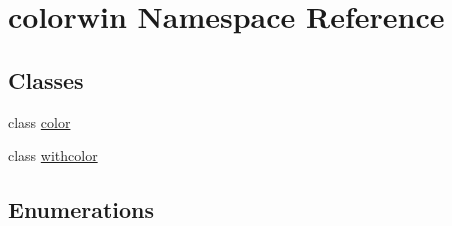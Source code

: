 \hypertarget{namespacecolorwin}{}\section{colorwin Namespace Reference}
\label{namespacecolorwin}
\subsection*{Classes}
\begin{DoxyCompactItemize}
\item 
class \hyperlink{classcolorwin_1_1color}{color}
\item 
class \hyperlink{classcolorwin_1_1withcolor}{withcolor}
\end{DoxyCompactItemize}
\subsection*{Enumerations}
